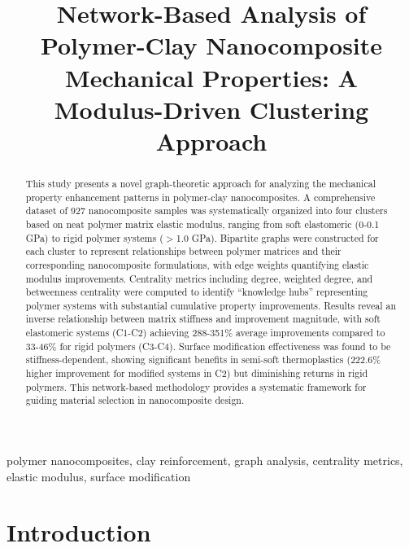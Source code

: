 \documentclass[conference]{IEEEtran}
\begin{document}
\title{Network-Based Analysis of Polymer-Clay Nanocomposite Mechanical Properties: A Modulus-Driven Clustering Approach}

\author{
}

\maketitle

\begin{abstract}
This study presents a novel graph-theoretic approach for analyzing the mechanical property enhancement patterns in polymer-clay nanocomposites. A comprehensive dataset of 927 nanocomposite samples was systematically organized into four clusters based on neat polymer matrix elastic modulus, ranging from soft elastomeric (0-0.1 GPa) to rigid polymer systems ($>$1.0 GPa). Bipartite graphs were constructed for each cluster to represent relationships between polymer matrices and their corresponding nanocomposite formulations, with edge weights quantifying elastic modulus improvements. Centrality metrics including degree, weighted degree, and betweenness centrality were computed to identify ``knowledge hubs'' representing polymer systems with substantial cumulative property improvements. Results reveal an inverse relationship between matrix stiffness and improvement magnitude, with soft elastomeric systems (C1-C2) achieving 288-351\% average improvements compared to 33-46\% for rigid polymers (C3-C4). Surface modification effectiveness was found to be stiffness-dependent, showing significant benefits in semi-soft thermoplastics (222.6\% higher improvement for modified systems in C2) but diminishing returns in rigid polymers. This network-based methodology provides a systematic framework for guiding material selection in nanocomposite design.
\end{abstract}

\begin{IEEEkeywords}
polymer nanocomposites, clay reinforcement, graph analysis, centrality metrics, elastic modulus, surface modification
\end{IEEEkeywords}

\section{Introduction}
\end{document}
